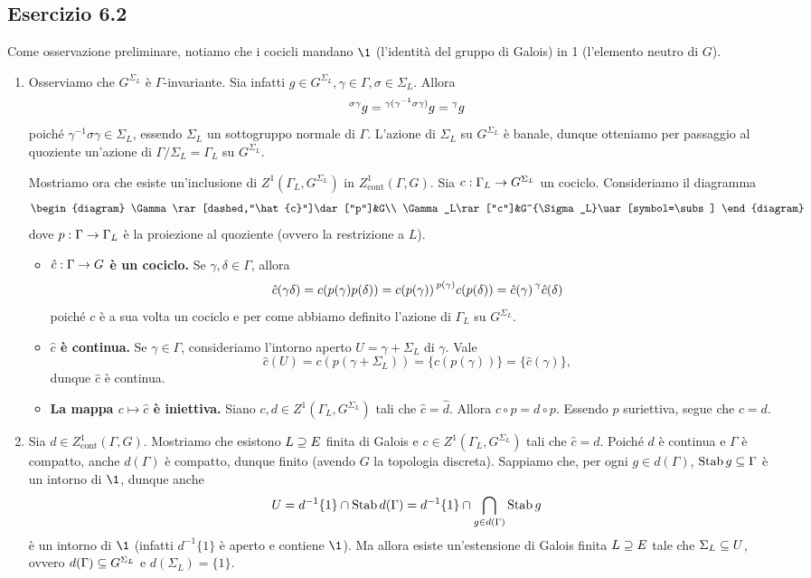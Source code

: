 \documentclass[a4paper]{article}
\newcommand*{\cont}{\ensuremath{\text{cont}}}
\begin{document}
\subsection*{Esercizio 6.2}
Come osservazione preliminare, notiamo che i cocicli mandano $\1$ (l'identità del gruppo di Galois) in 1 (l'elemento neutro di $G$).
\begin{enumerate}[(1)]
\item Osserviamo che $G^{\Sigma_L}$ è $\Gamma$-invariante. Sia infatti $g\in G^{\Sigma_L}\comma\gamma\in\Gamma\comma\sigma\in\Sigma_L$. Allora
$$
\prescript{\sigma\gamma}{}{g}=\prescript{\gamma(\gamma^{-1}\sigma\gamma)}{}{g}=\prescript{\gamma}{}{g}
$$
poiché $\gamma^{-1}\sigma\gamma\in\Sigma_L$, essendo $\Sigma_L$ un sottogruppo normale di $\Gamma$. L'azione di $\Sigma_L$ su $G^{\Sigma_L}$ è banale, dunque otteniamo per passaggio al quoziente un'azione di $\Gamma/\Sigma_L=\Gamma_L$ su $G^{\Sigma_L}$.

Mostriamo ora che esiste un'inclusione di $Z^1(\Gamma_L,G^{\Sigma_L})$ in $Z^1_\cont(\Gamma,G)$. Sia $c:\Gamma_L\rightarrow G^{\Sigma_L}$ un cociclo. Consideriamo il diagramma
$$
\begin{diagram}
\Gamma\rar[dashed,"\hat{c}"]\dar["p"]&G\\
\Gamma_L\rar["c"]&G^{\Sigma_L}\uar[symbol=\subs]
\end{diagram}
$$
dove $p:\Gamma\rightarrow \Gamma_L$ è la proiezione al quoziente (ovvero la restrizione a $L$).
\begin{itemize}
\item\textbf{$\hat{c}:\Gamma\rightarrow G$ è un cociclo.} Se $\gamma,\delta\in\Gamma$, allora
$$
\hat{c}(\gamma\delta)=c(p(\gamma)p(\delta))=c(p(\gamma))\prescript{p(\gamma)}{}{c(p(\delta))}=\hat{c}(\gamma)\prescript{\gamma}{}{\hat{c}(\delta)}
$$
poiché $c$ è a sua volta un cociclo e per come abbiamo definito l'azione di $\Gamma_L$ su $G^{\Sigma_L}$.
\item\textbf{$\hat{c}$ è continua.} Se $\gamma\in\Gamma$, consideriamo l'intorno aperto $U=\gamma+\Sigma_L$ di $\gamma$. Vale
$$
\hat{c}(U)=c(p(\gamma+\Sigma_L))=\{c(p(\gamma))\}=\{\hat{c}(\gamma)\},
$$
dunque $\hat{c}$ è continua.
\item\textbf{La mappa $c\mapsto\hat{c}$ è iniettiva.} Siano $c,d\in Z^1(\Gamma_L,G^{\Sigma_L})$ tali che $\hat{c}=\hat{d}$. Allora $c\circ p=d\circ p$. Essendo $p$ suriettiva, segue che $c=d$.
\end{itemize}
\item Sia $d\in Z^1_\cont(\Gamma,G)$. Mostriamo che esistono $L\supseteq E$ finita di Galois e $c\in Z^1(\Gamma_L,G^{\Sigma_L})$ tali che $\hat{c}=d$. Poiché $d$ è continua e $\Gamma$ è compatto, anche $d(\Gamma)$ è compatto, dunque finito (avendo $G$ la topologia discreta). Sappiamo che, per ogni $g\in d(\Gamma)$, $\operatorname{Stab} g\subseteq\Gamma$ è un intorno di $\1$, dunque anche 
$$
U=d^{-1}\{1\}\cap\operatorname{Stab} d(\Gamma)=d^{-1}\{1\}\cap\bigcap_{g\in d(\Gamma)}\operatorname{Stab} g
$$
è un intorno di $\1$ (infatti $d^{-1}\{1\}$ è aperto e contiene $\1$). Ma allora esiste un'estensione di Galois finita $L\supseteq E$ tale che $\Sigma_L\subseteq U$, ovvero $d(\Gamma)\subseteq G^{\Sigma_L}$ e $d(\Sigma_L)=\{1\}$.


\end{enumerate}
\end{document}
